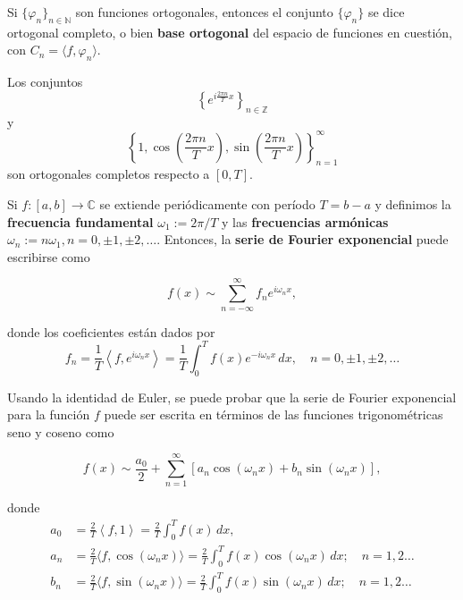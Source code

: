 Si $\{\varphi_{n}\}_{n\in \mathbb{N}}$ son funciones ortogonales, entonces el conjunto $\{\varphi_{n}\}$ se dice ortogonal completo, o bien \textbf{base ortogonal} del espacio de funciones en cuestión, con $C_{n} =  \langle f, \varphi_{n}\rangle$.

\begin{ejemplo}
Los conjuntos
\begin{equation}
\left\{e^{i\frac{2\pi n}{T}x} \right\}_{n \in \mathbb{Z}} 
\end{equation}
y
\begin{equation}
 \left\{1, \cos\left(\frac{2\pi n}{T}x\right) ,  \sin\left(\frac{2\pi n}{T}x\right) \right\}_{n=1}^{\infty} \label{eq:basis-trigo}  
\end{equation}
son ortogonales completos respecto a $[0,T]$.
\end{ejemplo}

Si $f:[a,b] \longrightarrow \mathbb{C}$ se extiende periódicamente con período $T = b-a$ y definimos la \textbf{frecuencia fundamental} $\omega_1 := 2\pi/T$ y las \textbf{frecuencias armónicas} $\omega_n := n \omega_1, n = 0, \pm 1, \pm 2,\dots$. Entonces, la \textbf{serie de Fourier exponencial} puede escribirse como 
\begin{shaded}
\begin{equation}
 f(x) \sim \sum_{n = - \infty}^{\infty} f_n e^{i \omega_n x},  \label{eq:Fourier-Exp}  
\end{equation}
\end{shaded}
donde los coeficientes están dados por
\begin{equation}
 f_n = \frac{1}{T} \left\langle f, e^{i \omega_n x} \right\rangle = \frac{1}{T} \int_0^{T} f(x) e^{-i \omega_n x} \,dx, \quad n = 0, \pm 1, \pm 2, \dots   
\end{equation} 

Usando la identidad de Euler, se puede probar que la serie de Fourier exponencial para la función $f$ puede ser escrita en términos de las funciones trigonométricas seno y coseno como
\begin{shaded}
\begin{equation}
f(x) \sim \frac{a_0}{2} + \sum_{n=1}^{\infty} \left[a_n \cos(\omega_n x) + b_n \sin(\omega_n x) \right], \label{eq:Fourier-Trigo}       
\end{equation}
\end{shaded}
donde
 \begin{align}
    a_0 &= \frac{2}{T} \left\langle f, 1 \right\rangle = \frac{2}{T} \int_0^{T} f(x) \,dx , \\
    a_n &= \frac{2}{T}\langle f,\cos(\omega_{n} x) \rangle = \frac{2}{T} \int_0^{T} f(x) \cos(\omega_n x) \,dx; \quad n = 1,2 \dots \\
    b_n &=\frac{2}{T}\langle f,\sin(\omega_{n} x) \rangle =\frac{2}{T} \int_0^{T} f(x) \sin(\omega_n x) \,dx; \quad n = 1,2 \dots
\end{align}   

